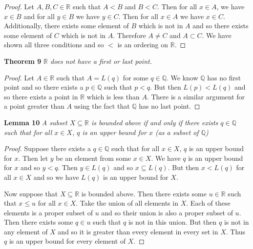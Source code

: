 \documentclass{article}
\begin{document}
\begin{flushleft}
\begin{proof}
Let $A, B, C \in \mathbb{R}$ such that $A < B$ and $B < C$. Then for all $x \in A$, we have $x \in B$ and for all $y \in B$ we have $y \in C$. Then for all $x \in A$ we have $x \in C$. Additionally, there exists some element of $B$ which is not in $A$ and so there exists some element of $C$ which is not in $A$. Therefore $A \neq C$ and $A \subset C$. We have shown all three conditions and so $<$ is an ordering on $\mathbb{R}$.
\end{proof}

\textbf{Theorem 9}
\textsl{$\mathbb{R}$ does not have a first or last point.}
\begin{proof}
Let $A \in \mathbb{R}$ such that $A = L(q)$ for some $q \in \mathbb{Q}$. We know $\mathbb{Q}$ has no first point and so there exists a $p \in \mathbb{Q}$ such that $p<q$. But then $L(p) < L(q)$ and so there exists a point in $\mathbb{R}$ which is less than $A$. There is a similar argument for a point greater than $A$ using the fact that $\mathbb{Q}$ has no last point.
\end{proof}

\textbf{Lemma 10}
\textsl{A subset $X \subseteq \mathbb{R}$ is bounded above if and only if there exists $q \in \mathbb{Q}$ such that for all $x \in X$, $q$ is an upper bound for $x$ (as a subset of $\mathbb{Q}$)}
\begin{proof}
Suppose there exists a $q \in \mathbb{Q}$ such that for all $x \in X$, $q$ is an upper bound for $x$. Then let $y$ be an element from some $x \in X$. We have $q$ is an upper bound for $x$ and so $y<q$. Then $y \in L(q)$ and so $x \subseteq L(q)$. But then $x < L(q)$ for all $x \in X$ and so we have $L(q)$ is an upper bound for $X$.\newline

Now suppose that $X \subseteq \mathbb{R}$ is bounded above. Then there exists some $u \in \mathbb{R}$ such that $x \leq u$ for all $x \in X$. Take the union of all elements in $X$. Each of these elements is a proper subset of $u$ and so their union is also a proper subset of $u$. Then there exists some $q \in u$ such that $q$ is not in this union. But then $q$ is not in any element of $X$ and so it is greater than every element in every set in $X$. Thus $q$ is an upper bound for every element of $X$.
\end{proof}


\end{flushleft}
\end{document}

